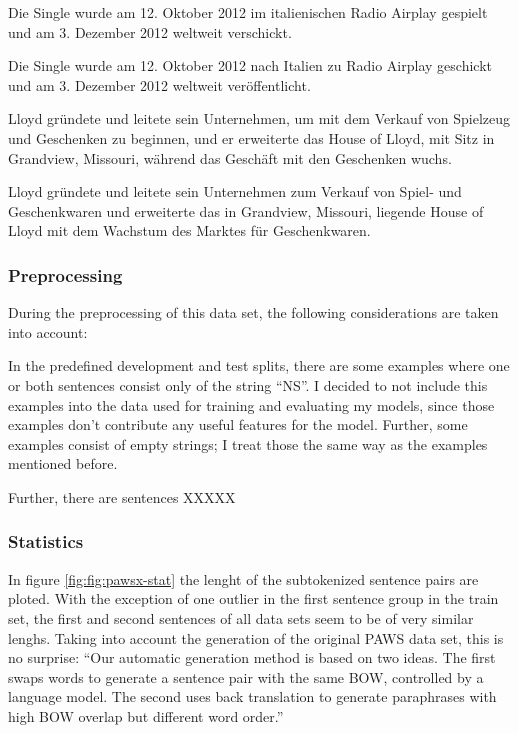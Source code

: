\begin{examples}
  \item \label{itm:paws-x1} Die Single wurde am 12. Oktober 2012 im italienischen Radio Airplay gespielt und am 3. Dezember 2012 weltweit verschickt.

  Die Single wurde am 12. Oktober 2012 nach Italien zu Radio Airplay geschickt und am 3. Dezember 2012 weltweit veröffentlicht.
  \item \label{itm:paws-x2} Lloyd gründete und leitete sein Unternehmen, um mit dem Verkauf von Spielzeug und Geschenken zu beginnen, und er erweiterte das House of Lloyd, mit Sitz in Grandview, Missouri, während das Geschäft mit den Geschenken wuchs.

  Lloyd gründete und leitete sein Unternehmen zum Verkauf von Spiel- und Geschenkwaren und erweiterte das in Grandview, Missouri, liegende House of Lloyd mit dem Wachstum des Marktes für Geschenkwaren.
\end{examples}

\subsubsection{Preprocessing}

During the preprocessing of this data set, the following considerations are taken into account:

In the predefined development and test splits, there are some examples where one or both sentences
consist
only of the string ``NS''.
I decided to not include this examples into the data used for training and evaluating my models,
since
those examples don't contribute any useful features for the model.
Further, some examples consist of empty strings; I treat those the same way as the examples
mentioned before.

Further, there are sentences XXXXX

\subsubsection{Statistics}

In figure \ref{fig:fig:pawsx-stat} the lenght of the subtokenized sentence pairs are ploted. With
the exception of one outlier in the first sentence group in the train set, the first and second
sentences of all data sets seem to be of very similar lenghs. Taking into account the generation
of the original PAWS data set, this is no surprise: ``Our automatic generation method is based
on two ideas. The first swaps words to generate a sentence pair with the same BOW, controlled by
a language model. The second uses back translation to generate paraphrases with high BOW overlap
but different word order.'' \citep{zhang2019paws}

